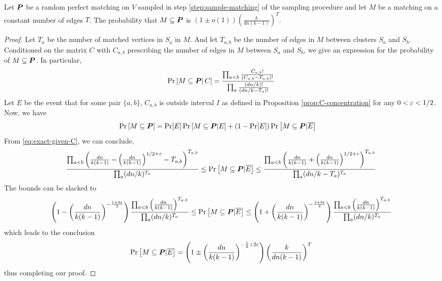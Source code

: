 \begin{proposition}	\label{prop:random-matching-prob}
	Let $\boldsymbol{P}$ be a random perfect matching on $V$ sampled in step \ref{step:sample-matching} of the sampling procedure and let $M$ be a matching on a constant number of edges $T$.  The probability that $M\subseteq \boldsymbol{P}$ is $(1\pm o(1))\left(\frac{k}{dn(k-1)}\right)^T$.
\end{proposition}
\begin{proof}
	Let $T_{a}$ be the number of matched vertices in $S_a$ in $M$.  And let $T_{a,b}$ be the number of edges in $M$ between clusters $S_a$ and $S_b$.  Conditioned on the matrix $C$ with $C_{a,b}$ prescribing the number of edges in $M$ between $S_a$ and $S_b$, we give an expression for the probability of $M\subseteq\boldsymbol{P}$.  In particular,
	\begin{align}
		\Pr\left[M\subseteq\boldsymbol{P}\right|C] = \frac{\prod_{a<b}\frac{C_{a,b}!}{(C_{a,b}-T_{a,b})!}}{\prod_a\frac{(dn/k)!}{(dn/k-T_a)!}} \label{eq:exact-given-C}
	\end{align}
	Let $E$ be the event that for some pair $\{a,b\}$, $C_{a,b}$ is outside interval $I$ as defined in Proposition \ref{prop:C-concentration} for any $0<\varepsilon<1/2$. Now, we have
	\begin{align}
		\Pr\left[M\subseteq\boldsymbol{P}\right] &= \Pr[E]\Pr\left[M\subseteq\boldsymbol{P}|E\right] + (1-\Pr[E])\Pr\left[M\subseteq\boldsymbol{P}|\overline{E}\right]	\label{eq:condition-break}
	\end{align}
	From \eqref{eq:exact-given-C}, we can conclude,
	\begin{align*}
		\frac{\prod_{a<b}\left(\frac{dn}{k(k-1)}-\left(\frac{dn}{k(k-1)}\right)^{1/2+\varepsilon}-T_{a,b}\right)^{T_{a,b}}}{\prod_a (dn/k)^{T_a}} \le \Pr\left[M\subseteq\boldsymbol{P}|\overline{E}\right] \le \frac{\prod_{a<b}\left(\frac{dn}{k(k-1)}+\left(\frac{dn}{k(k-1)}\right)^{1/2+\varepsilon}\right)^{T_{a,b}}}{\prod_a (dn/k-T_a)^{T_a}}
	\end{align*}
	The bounds can be slacked to
	\begin{align*}
		\left(1-\left(\frac{dn}{k(k-1)}\right)^{-\frac{1+4\varepsilon}{2}}\right)\frac{\prod_{a<b}\left(\frac{dn}{k(k-1)}\right)^{T_{a,b}}}{\prod_a (dn/k)^{T_a}} \le \Pr\left[M\subseteq\boldsymbol{P}|\overline{E}\right] \le \left(1+\left(\frac{dn}{k(k-1)}\right)^{-\frac{1+4\varepsilon}{2}}\right)\frac{\prod_{a<b}\left(\frac{dn}{k(k-1)}\right)^{T_{a,b}}}{\prod_a (dn/k)^{T_a}}
	\end{align*}
	which leads to the conclusion
	\begin{align*}
		\Pr\left[M\subseteq\boldsymbol{P}|\overline{E}\right] = \left(1\pm\left(\frac{dn}{k(k-1)}\right)^{-\frac{1}{2}+2\varepsilon}\right)\left(\frac{k}{dn(k-1)}\right)^T
	\end{align*}
	thus completing our proof.
\end{proof}


